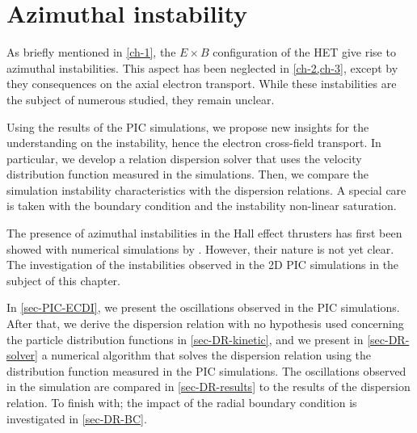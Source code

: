 



\chapter{Azimuthal instability}
\label{ch-5}

\begin{Chabstract}
  
As briefly mentioned in \cref{ch-1}, the $E \times B$ configuration of the \ac{HET} give rise to azimuthal instabilities.
This aspect has been neglected in \cref{ch-2,ch-3}, except by they consequences on the axial electron transport.
While these instabilities are the subject of numerous studied, they remain unclear.

Using the results of the \ac{PIC} simulations, we propose new insights for the understanding on the instability, hence the electron cross-field transport.
In particular, we develop a relation dispersion solver that uses the velocity distribution function measured in the simulations.
Then, we compare the simulation instability characteristics with the dispersion relations.
A special care is taken with the boundary condition and the instability non-linear saturation. 
\end{Chabstract}

% 
% 

\minitoc


The presence of azimuthal instabilities in the Hall effect thrusters has first been showed with numerical simulations by \citet{adam2004}.
However, their nature is not yet clear.
The investigation of the instabilities observed in the \ac{2D} \ac{PIC} simulations in the subject of this chapter.

In \cref{sec-PIC-ECDI}, we present the oscillations observed in the \ac{PIC} simulations.
After that, we derive the dispersion relation with no hypothesis used concerning the particle distribution functions in \cref{sec-DR-kinetic}, and we present in \cref{sec-DR-solver} a numerical algorithm that solves the dispersion relation using the distribution function measured in the \ac{PIC} simulations.
The oscillations observed in the simulation are compared in \cref{sec-DR-results} to the results of the dispersion relation.
To finish with; the impact of the radial boundary condition is investigated in \cref{sec-DR-BC}.








